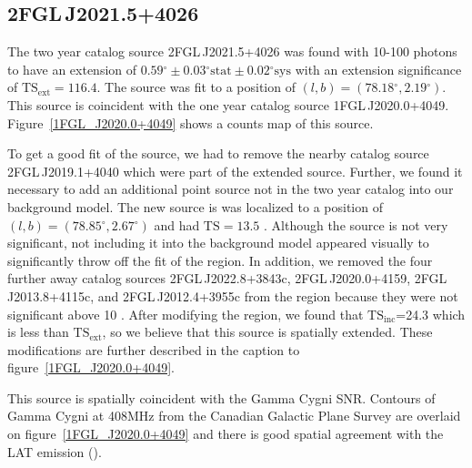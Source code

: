 \documentclass[12pt,preprint]{aastex}
\newcommand{\gev}{\text{GeV}\xspace}
\newcommand{\tsext}{{\ensuremath{\text{TS}_{\text{ext}}}}\xspace}
\newcommand{\tsinc}{\ensuremath{\text{TS}_{\text{inc}}}\xspace}
\newcommand{\ts}{\text{TS}\xspace}
\newcommand{\sys}{\text{sys}\xspace}
\newcommand{\stat}{\text{stat}\xspace}
\renewcommand{\deg}{\ensuremath{^\circ}\xspace}
\begin{document}



\subsection{2FGL\,J2021.5+4026}
\label{section_2FGL J2021.5+4026}



The two year catalog source 2FGL\,J2021.5+4026 was found with 10-100 \gev
photons to have an extension of $0.59\deg\pm0.03\deg\stat\pm0.02\deg\sys$
with an extension significance of $\tsext=116.4$.  The source was
fit to a position of $(l,b)=(78.18\deg,2.19\deg)$.  This source
is coincident with the one year catalog source 1FGL\,J2020.0+4049.
Figure~\ref{1FGL_J2020.0+4049} shows a counts map of this source.

To get a good fit of the source, we had to remove the nearby catalog
source 2FGL\,J2019.1+4040 which were part of the extended source.
Further, we found it necessary to add an additional point source not in
the two year catalog into our background model.  The new source is was
localized to a position of $(l,b)=(78.85\deg,2.67\deg)$ and had $\ts=13.5$ .
Although the source is not very significant, not including it into the
background model appeared visually to significantly throw off the fit
of the region.  In addition, we removed the four further away catalog
sources 2FGL\,J2022.8+3843c, 2FGL\,J2020.0+4159, 2FGL\,J2013.8+4115c,
and 2FGL\,J2012.4+3955c from the region because they were not significant
above 10 \gev.  After modifying the region, we found that \tsinc=24.3
which is less than \tsext, so we believe that this source is spatially
extended.  These modifications are further described in the caption to
figure~\ref{1FGL_J2020.0+4049}.

This source is spatially coincident with the Gamma Cygni SNR.  Contours of
Gamma Cygni at 408MHz from the Canadian Galactic Plane Survey are overlaid
on figure~\ref{1FGL_J2020.0+4049} and there is good spatial agreement
with the LAT emission (\cite{canadian_galactic_plane_survey}).

\end{document}
